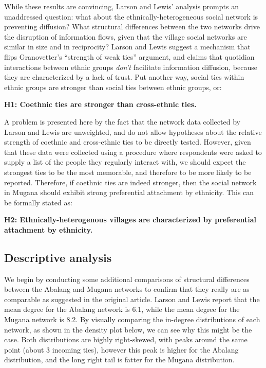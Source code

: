 \documentclass[]{article}
\begin{document}
While these results are convincing, Larson and Lewis' analysis prompts an unaddressed question: what about the ethnically-heterogeneous social network is preventing diffusion? What structural differences between the two networks drive the disruption of information flows, given that the village social networks are similar in size and in reciprocity? Larson and Lewis suggest a mechanism that flips Granovetter's ``strength of weak ties'' argument, and claims that quotidian interactions between ethnic groups \textit{don't} facilitate information diffusion, because they are characterized by a lack of trust. Put another way, social ties within ethnic groups are stronger than social ties between ethnic groups, or:

\textbf{H1: Coethnic ties are stronger than cross-ethnic ties.}

A problem is presented here by the fact that the network data collected by Larson and Lewis are unweighted, and do not allow hypotheses about the relative strength of coethnic and cross-ethnic ties to be directly tested. However, given that these data were collected using a procedure where respondents were asked to supply a list of the people they regularly interact with, we should expect the strongest ties to be the most memorable, and therefore to be more likely to be reported. Therefore, if coethnic ties are indeed stronger, then the social network in Mugana should exhibit strong preferential attachment by ethnicity. This can be formally stated as:

\textbf{H2: Ethnically-heterogenous villages are characterized by preferential attachment by ethnicity.}

\subsection{Descriptive analysis}

We begin by conducting some additional comparisons of structural differences between the Abalang and Mugana networks to confirm that they really are as comparable as suggested in the original article. Larson and Lewis report that the mean degree for the Abalang network is 6.1, while the mean degree for the Mugana network is 8.2. By visually comparing the in-degree distributions of each network, as shown in the density plot below, we can see why this might be the case. Both distributions are highly right-skewed, with peaks around the same point (about 3 incoming ties), however this peak is higher for the Abalang distribution, and the long right tail is fatter for the Mugana distribution.
\end{document}
